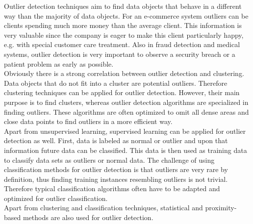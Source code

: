 Outlier detection techniques aim to find data objects that behave in a different way than the majority of data objects. For an e-commerce system outliers can be clients spending much more money than the average client. This information is very valuable since the company is eager to make this client particularly happy, e.g. with special customer care treatment. Also in fraud detection and medical systems, outlier detection is very important to observe a security breach or a patient problem as early as possible.
\\
Obviously there is a strong correlation between outlier detection and clustering. Data objects that do not fit into a cluster are potential outliers. Therefore clustering techniques can be applied for outlier detection. However, their main purpose is to find clusters, whereas outlier detection algorithms are specialized in finding outliers. These algorithms are often optimized to omit all dense areas and close data points to find outliers in a more efficient way.
\\
Apart from unsupervised learning, supervised learning can be applied for outlier detection as well. First, data is labeled as normal or outlier and upon that information future data can be classified. This data is then used as training data to classify data sets as outliers or normal data. The challenge of using classification methods for outlier detection is that outliers are very rare by definition, thus finding training instances resembling outliers is not trivial. Therefore typical classification algorithms often have to be adapted and optimized for outlier classification.
\\
Apart from clustering and classification techniques, statistical and proximity-based methods are also used for outlier detection.


